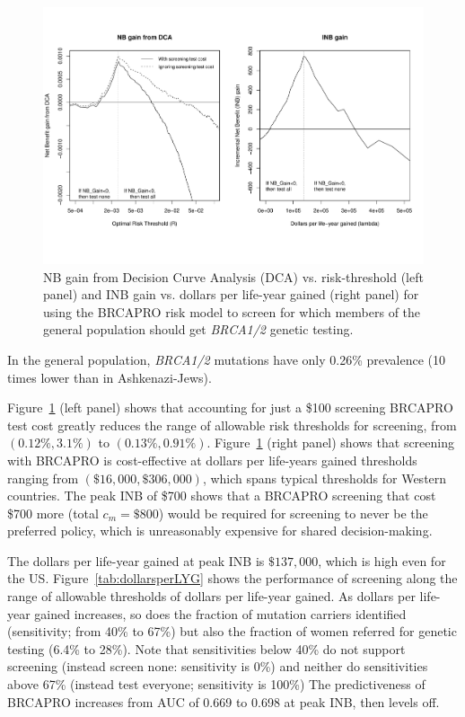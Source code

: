 \documentclass[AMA,STIX1COL]{WileyNJD-v2}
\begin{document}
\begin{figure}[t!]
	\centering
	\includegraphics[angle=-0,width=6.5in,]{testcostsGenPop.pdf}
	\caption{NB gain from Decision Curve Analysis (DCA) vs. risk-threshold (left panel) and INB gain vs. dollars per life-year gained (right panel) for using the BRCAPRO risk model to screen for which members of the general population should get \textit{BRCA1/2} genetic testing.}
	\label{fig:testcostsGenPop}
\end{figure}

In the general population, \textit{BRCA1/2} mutations have only 0.26\% prevalence (10 times lower than in Ashkenazi-Jews).  

Figure~\ref{fig:testcostsGenPop} (left panel) shows that accounting for just a \$100 screening BRCAPRO test cost greatly reduces the range of allowable risk thresholds for screening, from $(0.12\%,3.1\%)$ to $(0.13\%,0.91\%)$.  Figure~\ref{fig:testcostsGenPop} (right panel) shows that screening with BRCAPRO is cost-effective at dollars per life-years gained thresholds ranging from $(\$16,\!000,\$306,\!000)$, which spans typical thresholds for Western countries.  The peak INB of \$700 shows that a BRCAPRO screening that cost \$700 more (total $c_m=\$800$) would be required for screening to never be the preferred policy, which is unreasonably expensive for shared decision-making.  

The dollars per life-year gained at peak INB is $\$137,\!000$, which is high even for the US.  Figure~\ref{tab:dollarsperLYG} shows the performance of screening along the range of allowable thresholds of dollars per life-year gained.  As dollars per life-year gained increases, so does the fraction of mutation carriers identified (sensitivity; from 40\% to 67\%) but also the fraction of women referred for genetic testing (6.4\% to 28\%).  Note that sensitivities below 40\% do not support screening (instead screen none: sensitivity is 0\%) and neither do sensitivities above 67\% (instead test everyone; sensitivity is 100\%) The predictiveness of BRCAPRO increases from AUC of 0.669 to 0.698 at peak INB, then levels off.  
\end{document}
